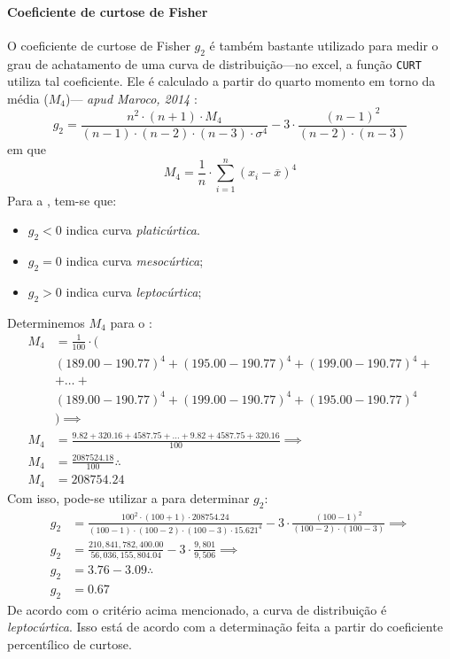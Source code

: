 \paragraph{Coeficiente de curtose de Fisher}
O coeficiente de curtose de Fisher $g_2$ é também bastante utilizado para medir
o grau de achatamento de uma curva de distribuição---no excel, a função
\texttt{CURT} utiliza tal coeficiente. Ele é calculado a partir do quarto
momento em torno da média ($M_4$)--- \emph{apud Maroco, 2014}
\parencite[p.~168]{favero}:
\begin{equation}
    g_2 = \frac{n^2 \cdot (n+1) \cdot M_4}{(n-1) \cdot (n-2) \cdot (n-3) \cdot \sigma^{4}} -
        3 \cdot \frac{(n-1)^2}{(n-2) \cdot (n-3)}
    \label{eq:coef-curtose-fisher}
\end{equation}
em que
\begin{equation}
    M_4 = \frac{1}{n} \cdot \sum_{i=1}^{n} (x_i - \overline{x})^{4}
    \label{eq:quarto-momento-media}
\end{equation}
Para a , tem-se que:
\begin{itemize}
    \item $g_2<0$ indica curva \emph{platicúrtica}.
    \item $g_2=0$ indica curva \emph{mesocúrtica};
    \item $g_2>0$ indica curva \emph{leptocúrtica};
\end{itemize}
Determinemos $M_4$ para o :
\begin{align*}
    M_4 &= \frac{1}{100} \cdot \Big( \\
    &(189.00-190.77)^4 + (195.00-190.77)^4 + (199.00-190.77)^4 + \\
    &+ \ldots + \\
    &(189.00-190.77)^4 + (199.00-190.77)^4 + (195.00-190.77)^4 \\
    &\Big) \implies \\
    M_4 &= \frac{9.82 + 320.16 + 4587.75 + \ldots + 9.82 + 4587.75 + 320.16}{100} \implies \\
    M_4 &= \frac{2087524.18}{100} \therefore \\
    M_4 &= 208754.24
\end{align*}
Com isso, pode-se utilizar a  para determinar
$g_2$:
\begin{align*}
    g_2 &= \frac{100^2 \cdot (100+1) \cdot 208754.24}{(100-1) \cdot (100-2) \cdot (100-3) \cdot 15.621^{4}} -
        3 \cdot \frac{(100-1)^2}{(100-2) \cdot (100-3)} \implies \\
    g_2 &= \frac{210,841,782,400.00}{56,036,155,804.04} -
        3 \cdot \frac{9,801}{9,506} \implies \\
    g_2 &= 3.76 - 3.09 \therefore \\
    g_2 &= 0.67
\end{align*}
De acordo com o critério acima mencionado, a curva de distribuição é
\emph{leptocúrtica}. Isso está de acordo com a determinação feita a partir do
coeficiente percentílico de curtose.

